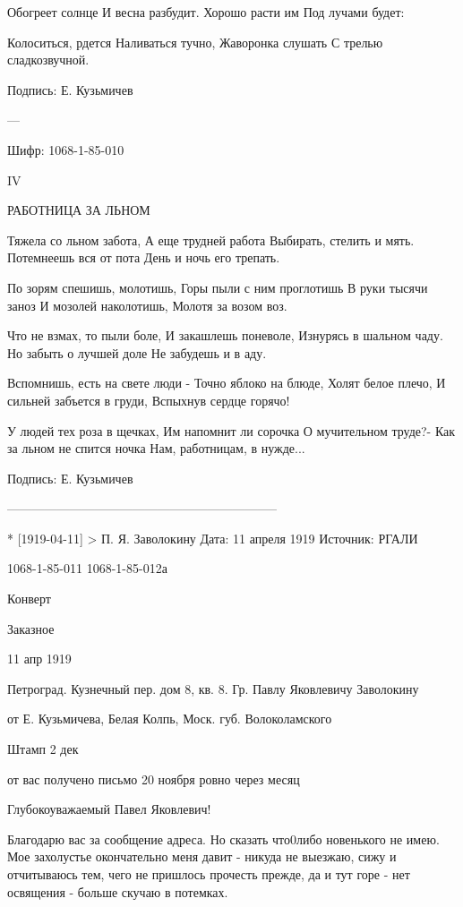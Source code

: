 \documentclass[]{memoir}
\begin{document}
Обогреет солнце
     И весна разбудит.
Хорошо расти им 
     Под лучами будет:

Колоситься, рдется
     Наливаться тучно,
Жаворонка слушать
     С трелью сладкозвучной.
     
Подпись: Е. Кузьмичев

---

Шифр:   1068-1-85-010

IV



РАБОТНИЦА ЗА ЛЬНОМ


Тяжела со льном забота,
А еще трудней работа
          Выбирать, стелить и мять.
Потемнеешь вся от пота
          День и ночь его трепать.

По зорям спешишь, молотишь,
Горы пыли с ним проглотишь
          В руки тысячи заноз
И мозолей наколотишь,
          Молотя за возом воз.

Что не взмах, то пыли боле,
И закашлешь поневоле,
          Изнурясь в шальном чаду.
Но забыть о лучшей доле
          Не забудешь и в аду.

Вспомнишь, есть на свете люди -   
Точно яблоко на блюде,
          Холят белое плечо,
И сильней забъется в груди,
          Вспыхнув сердце горячо!

У людей тех роза в щечках,
Им напомнит ли сорочка
          О мучительном труде?-
Как за льном не спится ночка
          Нам, работницам, в нужде...
          
Подпись: Е. Кузьмичев


-----------------------------------------------------------------

* [1919-04-11] > П. Я. Заволокину 
Дата: 11 апреля 1919
Источник: РГАЛИ

1068-1-85-011
1068-1-85-012а


Конверт

Заказное

11 апр 1919

Петроград. Кузнечный пер. дом 8, кв. 8.
Гр. Павлу Яковлевичу Заволокину

от Е. Кузьмичева,
Белая Колпь, Моск. губ. Волоколамского

Штамп 2 дек

от вас получено письмо 20 ноября ровно через месяц

Глубокоуважаемый Павел Яковлевич!

Благодарю вас за сообщение адреса. Но сказать что0либо новенького не имею. Мое захолустье окончательно меня давит - никуда не выезжаю, сижу и отчитываюсь тем, чего не пришлось прочесть прежде, да и тут горе - нет освящения - больше скучаю в потемках.
\end{document}
